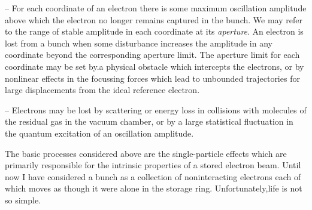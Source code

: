 -- For each coordinate of an electron there is some maximum oscillation amplitude above which the electron no longer remains captured in the bunch. We may refer to the range of stable amplitude in each coordinate at its \emph{aperture}. An electron is lost from a bunch when some disturbance increases the amplitude in any coordinate beyond the corresponding aperture limit. The aperture limit for each coordinate may be set by.a physical obstacle which intercepts the electrons, or by nonlinear effects in the focussing forces which lead to unbounded trajectories for large displacements from the ideal reference electron.

-- Electrons may be lost by scattering or energy loss in collisions with molecules of the residual gas in the vacuum chamber, or by a large statistical fluctuation in the quantum excitation of an oscillation amplitude.

The basic processes considered above are the single-particle effects which are primarily responsible for the intrinsic properties of a stored electron beam. Until now I have considered a bunch as a collection of noninteracting electrons each of which moves as though it were alone in the storage ring. Unfortunately,life is not so simple.
